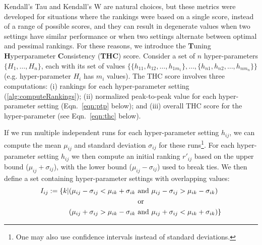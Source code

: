 \documentclass[10pt]{article} %
\begin{document}
Kendall's Tau \citep{kendall38measure} and Kendall's W \citep{10.1214/aoms/1177732186} are natural choices, but these metrics were developed for situations where the rankings were based on a single score, instead of a range of possible scores, and they can result in degenerate values when two settings have similar performance or when two settings alternate between optimal and pessimal rankings. For these reasons, we introduce the \textbf{T}uning \textbf{H}yperparameter \textbf{C}onsistency ({\bf THC}) score. Consider a set of $n$ hyper-parameters $\lbrace H_1,\ldots,H_n\rbrace$, each with its set of values $\lbrace\lbrace h_{11},h_{12},\ldots,h_{1m_1}\rbrace, \ldots,\lbrace h_{n1},h_{n2},\ldots,h_{nm_n}\rbrace\rbrace$ (e.g. hyper-parameter $H_i$ has $m_i$ values). The THC score involves three computations: (i) rankings for each hyper-parameter setting (\autoref{alg:computeRankings}); (ii) normalized peak-to-peak value for each hyper-parameter setting (Eqn.~\ref{eqn:ptp} below); and (iii) overall THC score for the hyper-parameter (see Eqn.~\ref{eqn:thc} below).

If we run multiple independent runs for each hyper-parameter setting $h_{ij}$, we can compute the mean $\mu_{ij}$ and standard deviation $\sigma_{ij}$ for these runs\footnote{One may also use confidence intervals instead of standard deviations.}. For each hyper-parameter setting $h_{ij}$ we then compute an initial ranking $r'_{ij}$ based on the upper bound ($\mu_{ij}+\sigma_{ij}$), with the lower bound ($\mu_{ij}-\sigma_{ij}$) used to break ties. We then define a set containing hyper-parameter settings with overlapping values:
\begin{align*}
    I_{ij} := \{k \vert (\mu_{ij} - \sigma_{ij} < \mu_{ik} + \sigma_{ik} &\text{ and } \mu_{ij} - \sigma_{ij} > \mu_{ik} - \sigma_{ik}) \\ &\text{ or } \\ \break (\mu_{ij} + \sigma_{ij} > \mu_{ik} - \sigma_{ik} &\text{ and } \mu_{ij} + \sigma_{ij} < \mu_{ik} + \sigma_{ik}) \}
\end{align*}
\end{document}
